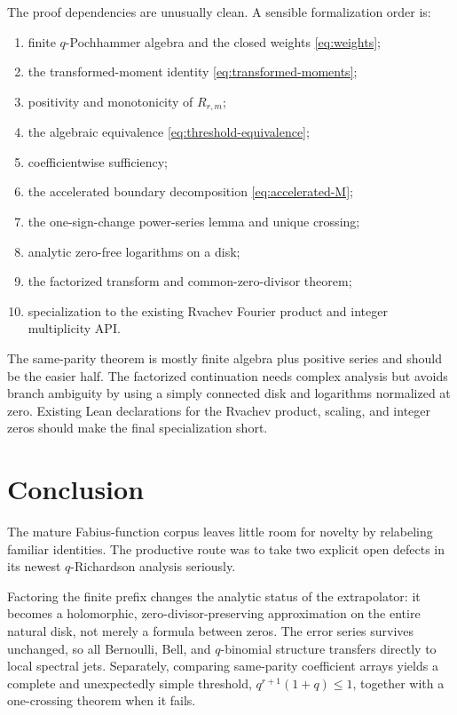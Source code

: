 \documentclass[11pt,oneside]{article}
\numberwithin{equation}{section}
\theoremstyle{frontier}
\theoremstyle{definition}
\theoremstyle{remark}
\begin{document}
The proof dependencies are unusually clean.  A sensible formalization order is:
\begin{enumerate}
\item finite $q$-Pochhammer algebra and the closed weights \eqref{eq:weights};
\item the transformed-moment identity \eqref{eq:transformed-moments};
\item positivity and monotonicity of $R_{r,m}$;
\item the algebraic equivalence \eqref{eq:threshold-equivalence};
\item coefficientwise sufficiency;
\item the accelerated boundary decomposition \eqref{eq:accelerated-M};
\item the one-sign-change power-series lemma and unique crossing;
\item analytic zero-free logarithms on a disk;
\item the factorized transform and common-zero-divisor theorem;
\item specialization to the existing Rvachev Fourier product and integer multiplicity API.
\end{enumerate}

The same-parity theorem is mostly finite algebra plus positive series and should be the easier
half.  The factorized continuation needs complex analysis but avoids branch ambiguity by
using a simply connected disk and logarithms normalized at zero.  Existing Lean declarations
for the Rvachev product, scaling, and integer zeros should make the final specialization
short.

\section{Conclusion}

The mature Fabius-function corpus leaves little room for novelty by relabeling familiar
identities.  The productive route was to take two explicit open defects in its newest
$q$-Richardson analysis seriously.

Factoring the finite prefix changes the analytic status of the extrapolator: it becomes a
holomorphic, zero-divisor-preserving approximation on the entire natural disk, not merely a
formula between zeros.  The error series survives unchanged, so all Bernoulli, Bell, and
$q$-binomial structure transfers directly to local spectral jets.  Separately, comparing
same-parity coefficient arrays yields a complete and unexpectedly simple threshold,
$q^{r+1}(1+q)\le1$, together with a one-crossing theorem when it fails.
\end{document}
